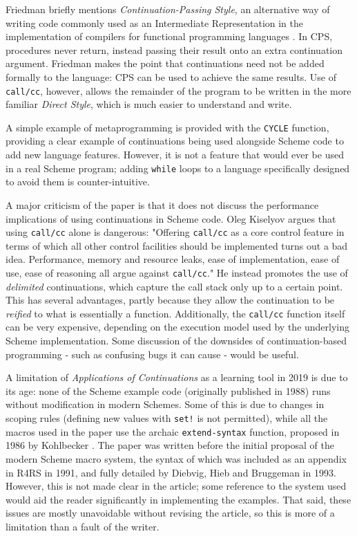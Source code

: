 \documentclass[11pt]{article}
\begin{document}
Friedman briefly mentions \emph{Continuation-Passing Style}, an alternative way of writing code commonly used as an Intermediate Representation in the implementation of compilers for functional programming languages \cite{steele1978rabbit}. In CPS, procedures never return, instead passing their result onto an extra continuation argument. Friedman makes the point that continuations need not be added formally to the language: CPS can be used to achieve the same results. Use of \texttt{call/cc}, however, allows the remainder of the program to be written in the more familiar \emph{Direct Style}, which is much easier to understand and write.

A simple example of metaprogramming is provided with the \texttt{CYCLE} function, providing a clear example of continuations being used alongside Scheme code to add new language features. However, it is not a feature that would ever be used in a real Scheme program; adding \texttt{while} loops to a language specifically designed to avoid them is counter-intuitive.

A major criticism of the paper is that it does not discuss the performance implications of using continuations in Scheme code. Oleg Kiselyov argues that using \texttt{call/cc} alone is dangerous: "Offering \texttt{call/cc} as a core control feature in terms of which all other control facilities should be implemented turns out a bad idea. Performance, memory and resource leaks, ease of implementation, ease of use, ease of reasoning all argue against \texttt{call/cc}."\cite{Kiselyov:againstcallcc} He instead promotes the use of \emph{delimited} continuations, which capture the call stack only up to a certain point. This has several advantages, partly because they allow the continuation to be \emph{reified} to what is essentially a function. Additionally, the \texttt{call/cc} function itself can be very expensive, depending on the execution model used by the underlying Scheme implementation. Some discussion of the downsides of continuation-based programming - such as confusing bugs it can cause - would be useful.

A limitation of \emph{Applications of Continuations} as a learning tool in 2019 is due to its age: none of the Scheme example code (originally published in 1988) runs without modification in modern Schemes. Some of this is due to changes in scoping rules (defining new values with \texttt{set!} is not permitted), while all the macros used in the paper use the archaic \texttt{extend-syntax} function, proposed in 1986 by Kohlbecker \cite{Kohlbecker:1986:SEP:19214}. The paper was written before the initial proposal of the modern Scheme macro system, the syntax of which was included as an appendix in R4RS \cite{abelson1991revised} in 1991, and fully detailed by Diebvig, Hieb and Bruggeman\cite{dybvig1993syntactic} in 1993. However, this is not made clear in the article; some reference to the system used would aid the reader significantly in implementing the examples. That said, these issues are mostly unavoidable without revising the article, so this is more of a limitation than a fault of the writer.
\end{document}
